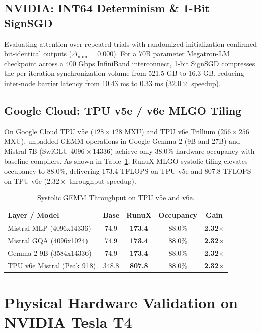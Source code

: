 \documentclass[10pt,twocolumn]{article}
\begin{document}
\subsection{NVIDIA: INT64 Determinism \& 1-Bit SignSGD}

Evaluating attention over repeated trials with randomized initialization confirmed bit-identical outputs ($\Delta_{\mathrm{num}} = 0.000$). For a 70B parameter Megatron-LM checkpoint across a 400 Gbps InfiniBand interconnect, 1-bit SignSGD compresses the per-iteration synchronization volume from 521.5 GB to 16.3 GB, reducing inter-node barrier latency from 10.43 ms to 0.33 ms ($32.0\times$ speedup).

\subsection{Google Cloud: TPU v5e / v6e MLGO Tiling}

On Google Cloud TPU v5e ($128 \times 128$ MXU) and TPU v6e Trillium ($256 \times 256$ MXU), unpadded GEMM operations in Google Gemma 2 (9B and 27B) and Mistral 7B (SwiGLU $4096 \times 14336$) achieve only 38.0\% hardware occupancy with baseline compilers. As shown in Table~\ref{tab:tpu}, RunuX MLGO systolic tiling elevates occupancy to 88.0\%, delivering 173.4 TFLOPS on TPU v5e and 807.8 TFLOPS on TPU v6e ($2.32\times$ throughput speedup).

\begin{table}[h]
\centering
\small
\caption{Systolic GEMM Throughput on TPU v5e and v6e.}
\label{tab:tpu}
\begin{tabular}{lcccc}
\toprule
\textbf{Layer / Model} & \textbf{Base} & \textbf{RunuX} & \textbf{Occupancy} & \textbf{Gain} \\
\midrule
Mistral MLP (4096x14336)  & 74.9 & \textbf{173.4} & 88.0\% & \textbf{2.32$\times$} \\
Mistral GQA (4096x1024)   & 74.9 & \textbf{173.4} & 88.0\% & \textbf{2.32$\times$} \\
Gemma 2 9B (3584x14336)   & 74.9 & \textbf{173.4} & 88.0\% & \textbf{2.32$\times$} \\
TPU v6e Mistral (Peak 918) & 348.8 & \textbf{807.8} & 88.0\% & \textbf{2.32$\times$} \\
\bottomrule
\end{tabular}
\end{table}

\section{Physical Hardware Validation on NVIDIA Tesla T4}
\end{document}
